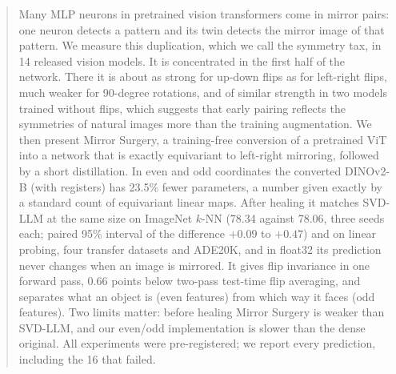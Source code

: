 \begin{abstract}
Many MLP neurons in pretrained vision transformers come in mirror pairs: one neuron detects a pattern and its twin
detects the mirror image of that pattern. We measure this duplication, which we call the symmetry tax, in 14 released
vision models. It is concentrated in the first half of the network. There it is about as strong for up-down flips as
for left-right flips, much weaker for 90-degree rotations, and of similar strength in two models trained without
flips, which suggests that early pairing reflects the symmetries of natural images more than the training
augmentation. We then present Mirror Surgery, a training-free conversion of a pretrained ViT into a network that is
exactly equivariant to left-right mirroring, followed by a short distillation. In even and odd coordinates the
converted DINOv2-B (with registers) has 23.5\% fewer parameters, a number given exactly by a standard count of equivariant linear
maps. After healing it matches SVD-LLM at the same size on ImageNet $k$-NN (78.34 against 78.06, three seeds each;
paired 95\% interval of the difference $+0.09$ to $+0.47$) and on linear probing, four transfer datasets and ADE20K,
and in float32 its prediction never changes when an image is mirrored. It gives flip invariance in one forward pass,
0.66 points below two-pass test-time flip averaging, and separates what an object is (even features) from which way
it faces (odd features). Two limits matter: before healing Mirror Surgery is weaker than SVD-LLM, and our even/odd
implementation is slower than the dense original. All experiments were pre-registered; we report every prediction,
including the 16 that failed.
\end{abstract}

